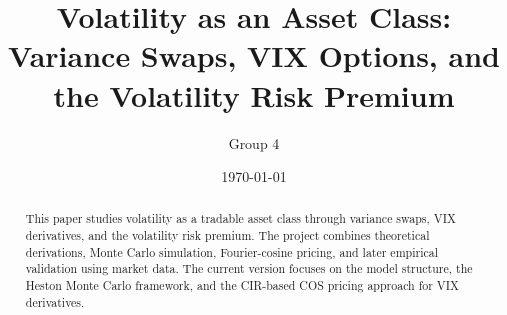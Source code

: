 \documentclass[12pt]{article}
\title{Volatility as an Asset Class: Variance Swaps, VIX Options, and the Volatility Risk Premium}
\author{Group 4}
\date{\today}
\begin{document}
\maketitle

\begin{abstract}
This paper studies volatility as a tradable asset class through variance swaps, VIX derivatives, and the volatility risk premium. The project combines theoretical derivations, Monte Carlo simulation, Fourier-cosine pricing, and later empirical validation using market data. The current version focuses on the model structure, the Heston Monte Carlo framework, and the CIR-based COS pricing approach for VIX derivatives.
\end{abstract}

\tableofcontents
\newpage












\end{document}
